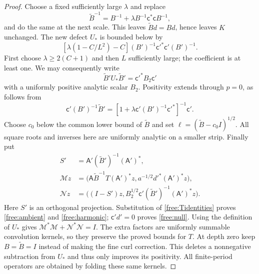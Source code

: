\begin{proof}
Choose a fixed sufficiently large $\lambda$ and replace
\[
 \widetilde B^{-1}=B^{-1}
     +\lambda B^{-1}\mathsf c^*\mathsf c B^{-1},
\]
and do the same at the next scale. This leaves
$\widetilde Bd=Bd$, hence leaves $K$ unchanged. The new defect
$U_*$ is bounded below by
\[
 [\lambda(1-C/L^2)-C]
       (B')^{-1}\mathsf c'^*\mathsf c'(B')^{-1}.
\]
First choose $\lambda\ge2(C+1)$ and then $L$ sufficiently large; the
coefficient is at least one. We may consequently write
\[
 \widetilde B'U_*\widetilde B'=\mathsf c'^*B_2\mathsf c'
\]
with a uniformly positive analytic scalar $B_2$. Positivity extends
through $p=0$, as follows from
\[
 \mathsf c'(B')^{-1}\widetilde B'
 =[1+\lambda\mathsf c'(B')^{-1}\mathsf c'^*]^{-1}\mathsf c'.
\]
Choose $c_0$ below the common lower bound of $\widetilde B$ and set
$\ell=(\widetilde B-c_0I)^{1/2}$. All square roots and inverses here are
uniformly analytic on a smaller strip. Finally put
\begin{align*}
 S'&=\mathsf A'(\widetilde B')^{-1}(\mathsf A')^*,\\
 \mathcal Mz&=\bigl(\mathsf A\widetilde B^{-1}T(\mathsf A')^*z,
                   a^{-1/2}d'^*(\mathsf A')^*z\bigr),\\
 \mathcal Nz&=\bigl((I-S')z,
 B_2^{1/2}\mathsf c'(\widetilde B')^{-1}(\mathsf A')^*z\bigr).
\end{align*}
Here $S'$ is an orthogonal projection. Substitution of
\eqref{free:Tidentities} proves \eqref{free:ambient} and
\eqref{free:harmonic}; $\mathsf c'd'=0$ proves \eqref{free:null}.
Using the definition of $U_*$ gives
$\mathcal M^*\mathcal M+\mathcal N^*\mathcal N=I$.
The extra factors are uniformly summable convolution kernels, so they
preserve the proved bounds for $T$. At depth zero keep $B=\widetilde
B=I$ instead of making the fine curl correction. This deletes a
nonnegative subtraction from $U_*$ and thus only improves its positivity.
All finite-period operators are obtained by folding these same kernels.
\end{proof}


